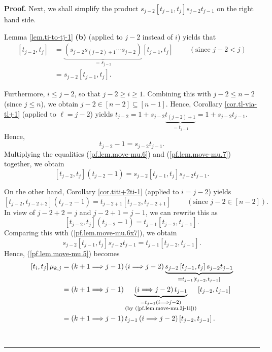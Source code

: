 \documentclass[numbers=enddot,12pt,final,onecolumn,notitlepage]{scrartcl}%
\theoremstyle{definition}
\newenvironment{proof}[1][Proof]{\noindent\textbf{#1.} }{\ \rule{0.5em}{0.5em}}
\begin{document}
\begin{proof}
Next, we shall simplify the product $s_{j-2}\left[  t_{j-1},t_{j}\right]
s_{j-2}t_{j-1}$ on the right hand side.

Lemma \ref{lem.ti-to-tj-1} \textbf{(b)} (applied to $j-2$ instead of $i$)
yields that%
\begin{align}
\left[  t_{j-2},t_{j}\right]   &  =\underbrace{\left(  s_{j-2}s_{\left(
j-2\right)  +1}\cdots s_{j-2}\right)  }_{=s_{j-2}}\left[  t_{j-1}%
,t_{j}\right]  \ \ \ \ \ \ \ \ \ \ \left(  \text{since }j-2<j\right)
\nonumber\\
&  =s_{j-2}\left[  t_{j-1},t_{j}\right]  .\label{pf.lem.move-mu.6}%
\end{align}


Furthermore, $i\leq j-2$, so that $j-2\geq i\geq1$. Combining this with
$j-2\leq n-2$ (since $j\leq n$), we obtain $j-2\in\left[  n-2\right]
\subseteq\left[  n-1\right]  $. Hence, Corollary \ref{cor.tl-via-tl+1}
(applied to $\ell=j-2$) yields $t_{j-2}=1+s_{j-2}\underbrace{t_{\left(
j-2\right)  +1}}_{=t_{j-1}}=1+s_{j-2}t_{j-1}$. Hence,
\begin{equation}
t_{j-2}-1=s_{j-2}t_{j-1}.\label{pf.lem.move-mu.7}%
\end{equation}
Multiplying the equalities (\ref{pf.lem.move-mu.6}) and
(\ref{pf.lem.move-mu.7}) together, we obtain%
\begin{equation}
\left[  t_{j-2},t_{j}\right]  \left(  t_{j-2}-1\right)  =s_{j-2}\left[
t_{j-1},t_{j}\right]  s_{j-2}t_{j-1}.\label{pf.lem.move-mu.6x7}%
\end{equation}


On the other hand, Corollary \ref{cor.titi+2ti-1} (applied to $i=j-2$) yields
\[
\left[  t_{j-2},t_{j-2+2}\right]  \left(  t_{j-2}-1\right)  =t_{j-2+1}\left[
t_{j-2},t_{j-2+1}\right]  \ \ \ \ \ \ \ \ \ \ \left(  \text{since }%
j-2\in\left[  n-2\right]  \right)  .
\]
In view of $j-2+2=j$ and $j-2+1=j-1$, we can rewrite this as
\[
\left[  t_{j-2},t_{j}\right]  \left(  t_{j-2}-1\right)  =t_{j-1}\left[
t_{j-2},t_{j-1}\right]  .
\]
Comparing this with (\ref{pf.lem.move-mu.6x7}), we obtain%
\[
s_{j-2}\left[  t_{j-1},t_{j}\right]  s_{j-2}t_{j-1}=t_{j-1}\left[
t_{j-2},t_{j-1}\right]  .
\]
Hence, (\ref{pf.lem.move-mu.5}) becomes%
\begin{align}
\left[  t_{i},t_{j}\right]  \mu_{k,j}  &  =\left(  k+1\Longrightarrow
j-1\right)  \left(  i\Longrightarrow j-2\right)  \underbrace{s_{j-2}\left[
t_{j-1},t_{j}\right]  s_{j-2}t_{j-1}}_{=t_{j-1}\left[  t_{j-2},t_{j-1}\right]
}\nonumber\\
&  =\left(  k+1\Longrightarrow j-1\right)  \underbrace{\left(
i\Longrightarrow j-2\right)  t_{j-1}}_{\substack{=t_{j-1}\left(
i\Longrightarrow j-2\right)  \\\text{(by (\ref{pf.lem.move-mu.3j-1i}))}%
}}\left[  t_{j-2},t_{j-1}\right] \nonumber\\
&  =\left(  k+1\Longrightarrow j-1\right)  t_{j-1}\left(  i\Longrightarrow
j-2\right)  \left[  t_{j-2},t_{j-1}\right]  . \label{pf.lem.move-mu.9}%
\end{align}



\end{proof}
\end{document}
